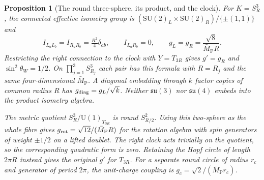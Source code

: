 \documentclass[aps,pra,onecolumn,superscriptaddress,nofootinbib,10pt]{revtex4-2}
\newtheorem{proposition}[theorem]{Proposition}
\theoremstyle{definition}
\theoremstyle{remark}
\newcommand{\SU}{\mathrm{SU}}
\begin{document}
\begin{proposition}[The round three-sphere, its product, and the clock]\label{cr:s3}
For $K=S^3_R$, the connected effective isometry group is
$(\SU(2)_L\times\SU(2)_R)/\{\pm(1,1)\}$ and
\[
 I_{L_aL_b}=I_{R_aR_b}=\tfrac{R^2}{4}\delta_{ab},\qquad
 I_{L_aR_b}=0,\qquad
 g_L=g_R=\frac{\sqrt8}{\bar M_{\mathrm P}R}.
\]
Restricting the right connection to the clock with
$Y=T_{3R}$ gives $g'=g_R$ and $\sin^2\theta_W=1/2$.
On $\prod_{j=1}^3 S^3_{R_j}$ each pair has this formula with
$R=R_j$ and the same four-dimensional $\bar M_{\mathrm P}$.
A diagonal embedding through $k$ factor copies of common radius $R$
has $g_{\rm diag}=g_L/\sqrt k$. Neither $\mathfrak{su}(3)$ nor
$\mathfrak{su}(4)$ embeds into the product isometry algebra.

The metric quotient $S^3_R/\mathrm{U}(1)_{T_{3R}}$ is round
$S^2_{R/2}$. Using this two-sphere as the whole fibre gives
$g_{\rm rot}=\sqrt{12}/(\bar M_{\mathrm P}R)$ for the rotation
algebra with spin generators of weight $\pm1/2$ on a lifted doublet.
The right clock acts trivially on the quotient, so the corresponding
quadratic form is zero. Retaining the Hopf circle of length $2\pi R$
instead gives the original $g'$ for $T_{3R}$. For a separate round
circle of radius $r_c$ and generator of period $2\pi$, the unit-charge
coupling is $g_c=\sqrt2/(\bar M_{\mathrm P}r_c)$.
\end{proposition}
\end{document}
